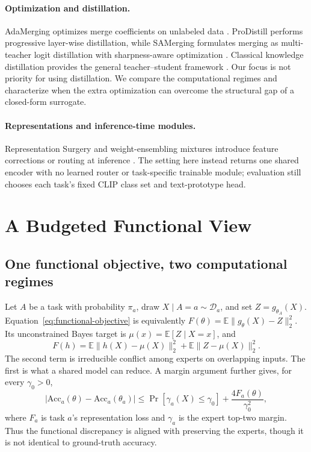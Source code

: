 \documentclass[letterpaper]{article} %
\theoremstyle{plain}
\theoremstyle{definition}
\begin{document}
\paragraph{Optimization and distillation.}
AdaMerging optimizes merge coefficients on unlabeled data
\citep{yang2024adamerging}. ProDistill performs progressive layer-wise distillation, while
SAMerging formulates merging as multi-teacher logit distillation with sharpness-aware
optimization \citep{prodistill2025,samerging2025}. Classical knowledge distillation
provides the general teacher--student framework \citep{hinton2015distilling}. Our focus is
not priority for using distillation. We compare the computational regimes and characterize
when the extra optimization can overcome the structural gap of a closed-form surrogate.

\paragraph{Representations and inference-time modules.}
Representation Surgery and weight-ensembling mixtures introduce feature corrections or
routing at inference \citep{yang2024surgery,tang2024wemoe}. The setting here instead
returns one shared encoder with no learned router or task-specific trainable module;
evaluation still chooses each task's fixed CLIP class set and text-prototype head.

\section{A Budgeted Functional View}
\label{sec:theory}

\subsection{One functional objective, two computational regimes}
\label{sec:common-objective}

Let $A$ be a task with probability $\pi_a$, draw $X\mid A=a\sim\mathcal D_a$, and set
$Z=g_{\theta_A}(X)$. Equation~\eqref{eq:functional-objective} is equivalently
$F(\theta)=\mathbb E\|g_\theta(X)-Z\|_2^2$. Its unconstrained Bayes target is
$\mu(x)=\mathbb E[Z\mid X=x]$, and
\begin{equation}
F(h)=\mathbb E\|h(X)-\mu(X)\|_2^2
+\mathbb E\|Z-\mu(X)\|_2^2.
\label{eq:bayes-main}
\end{equation}
The second term is irreducible conflict among experts on overlapping inputs. The first is
what a shared model can reduce. A margin argument further gives, for every $\gamma_0>0$,
\begin{equation}
|\mathrm{Acc}_a(\theta)-\mathrm{Acc}_a(\theta_a)|
\le
\Pr[\gamma_a(X)\le\gamma_0]
+\frac{4F_a(\theta)}{\gamma_0^2},
\label{eq:accuracy-main}
\end{equation}
where $F_a$ is task $a$'s representation loss and $\gamma_a$ is the expert top-two
margin. Thus the functional discrepancy is aligned with preserving the experts, though it
is not identical to ground-truth accuracy.
\end{document}

